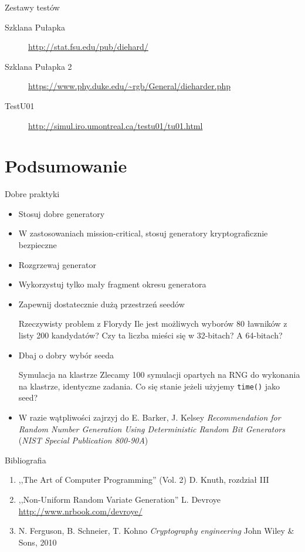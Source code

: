 \documentclass{mp}
\begin{document}
\begin{frame}{Zestawy testów}
\begin{description}
\item[Szklana Pułapka]
\url{http://stat.fsu.edu/pub/diehard/}
\item[Szklana Pułapka 2]
{\small \url{https://www.phy.duke.edu/~rgb/General/dieharder.php}}
\item[TestU01]
\url{http://simul.iro.umontreal.ca/testu01/tu01.html}
\end{description}
\end{frame}

\section{Podsumowanie}

\begin{frame}{Dobre praktyki}
\begin{itemize}
\item Stosuj dobre generatory
\pause
\item W zastosowaniach mission-critical, stosuj generatory kryptograficznie bezpieczne
\pause
\item Rozgrzewaj generator
\pause
\item Wykorzystuj tylko mały fragment okresu generatora
\pause
\item Zapewnij dostatecznie dużą przestrzeń seedów
{
\begin{block}{Rzeczywisty problem z Florydy}
Ile jest możliwych wyborów 80 ławników z listy 200 kandydatów?
Czy ta liczba mieści się w 32-bitach? A 64-bitach?
\end{block}
}
\pause
\item Dbaj o dobry wybór seeda
{
\begin{block}{Symulacja na klastrze}
Zlecamy 100 symulacji opartych na RNG do wykonania na klastrze, identyczne zadania.
Co się stanie jeżeli użyjemy \texttt{time()} jako seed?
\end{block}
}
\pause
\item W razie wątpliwości zajrzyj do E. Barker, J. Kelsey \emph{Recommendation for Random Number Generation Using Deterministic Random Bit Generators} (\emph{NIST Special Publication 800-90A})
\end{itemize}
\end{frame}


\begin{frame}{Bibliografia}
\begin{enumerate}
\item ,,The Art of Computer Programming'' (Vol. 2) D. Knuth, rozdział III
\item ,,Non-Uniform Random Variate Generation'' L. Devroye \url{http://www.nrbook.com/devroye/}
\item N. Ferguson, B. Schneier, T. Kohno \emph{Cryptography engineering} John Wiley \& Sons, 2010
\end{enumerate}
\end{frame}
\end{document}
